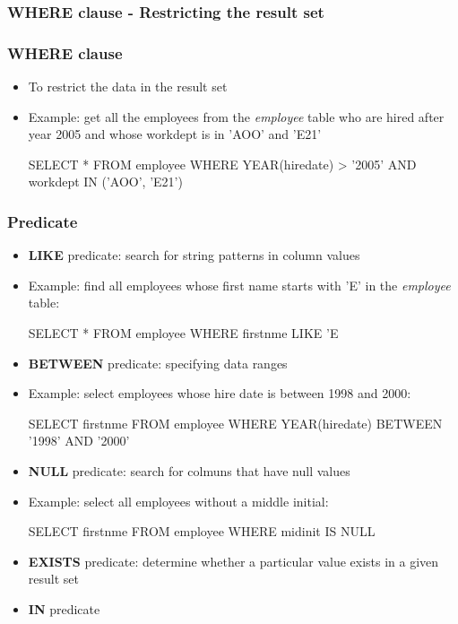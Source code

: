 \documentclass{article}
\begin{document}
\subsubsection{WHERE clause - Restricting the result set}
\subsubsection*{WHERE clause}
\begin{itemize}
\item To restrict the data in the result set
\item Example: get all the employees from the \textit{employee} table who are hired after year 2005
and whose workdept is in 'AOO' and 'E21'
\begin{sqlcode}
SELECT * FROM employee WHERE YEAR(hiredate) > '2005' AND workdept IN ('AOO', 'E21')
\end{sqlcode}
\end{itemize}
\subsubsection*{Predicate}
\begin{itemize}
\item \textbf{LIKE} predicate: search for string patterns in column values
\item Example: find all employees whose first name starts with 'E' in the \textit{employee} table:
\begin{sqlcode}
SELECT * FROM employee WHERE firstnme LIKE 'E%
\end{sqlcode}
\item \textbf{BETWEEN} predicate: specifying data ranges
\item Example: select employees whose hire date is between 1998 and 2000:
\begin{sqlcode}
SELECT firstnme FROM employee WHERE YEAR(hiredate) BETWEEN '1998' AND '2000'
\end{sqlcode}
\item \textbf{NULL} predicate: search for colmuns that have null values
\item Example: select all employees without a middle initial:
\begin{sqlcode}
SELECT firstnme FROM employee WHERE midinit IS NULL
\end{sqlcode}
\item \textbf{EXISTS} predicate: determine whether a particular value exists in a given result set
\item \textbf{IN} predicate
\end{itemize}
\end{document}
